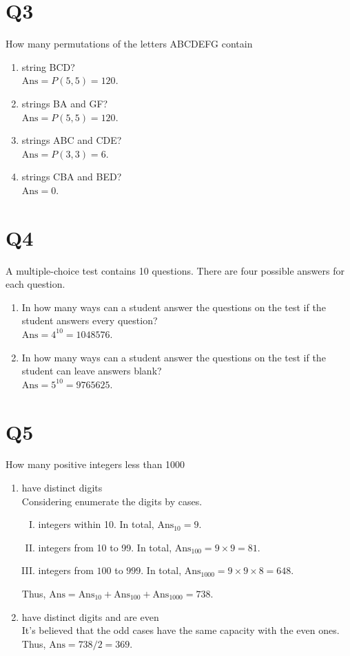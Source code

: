 \documentclass[11pt]{article}
\newenvironment{qparts}{\begin{enumerate}[{(}a{)}]}{\end{enumerate}}
\begin{document}
\section*{Q3}
How many permutations of the letters ABCDEFG contain
\begin{qparts}
    
    \item string BCD?\\
    $\text{Ans}=P(5,5)=120$.
    \item strings BA and GF?\\
    $\text{Ans}=P(5,5)=120$.
    \item strings ABC and CDE?\\
    $\text{Ans}=P(3,3)=6$.
    \item strings CBA and BED?\\
    $\text{Ans}=0$.
\end{qparts}

\section*{Q4}
A multiple-choice test contains 10 questions. There are four
possible answers for each question.
\begin{qparts}
    
    \item In how many ways can a student answer the questions on the test if the student answers every question?\\
    $\text{Ans}=4^{10}=1048576$.

    \item In how many ways can a student answer the questions on the test if the student can leave answers blank?\\
    $\text{Ans}=5^{10}=9765625$.


\end{qparts}

\section*{Q5}
How many positive integers less than 1000
\begin{qparts}
    
    \item have distinct digits\\
    Considering enumerate the digits by cases.
    \begin{enumerate}[I. ]
        \item integers within 10. In total, $\text{Ans}_{10}=9$.
        \item integers from 10 to 99. In total, $\text{Ans}_{100}=9\times 9=81$.
        \item integers from $100$ to $999$. In total, $\text{Ans}_{1000}=
        9\times 9\times 8=648$.
    \end{enumerate}
    Thus, $\text{Ans}=\text{Ans}_{10}+\text{Ans}_{100}+\text{Ans}_{1000}=738$.

    \item have distinct digits and are even\\
    It's believed that the odd cases have the same capacity with the even ones. Thus, $\text{Ans}=738 / 2=369$.
\end{qparts}
\end{document}
